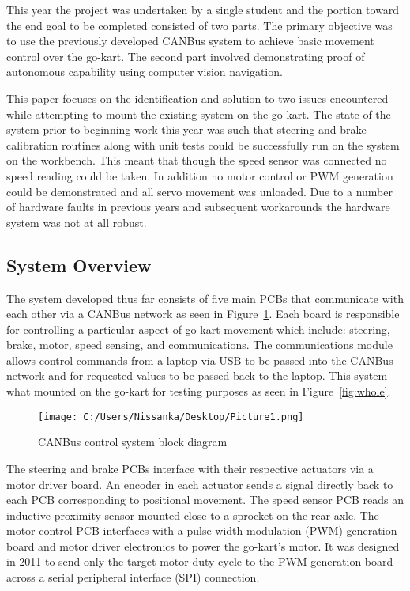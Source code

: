 \documentclass{ENZCon}
\begin{document}
This year the project was undertaken by a single student and the portion toward the end goal to be completed 
consisted of two parts. The primary objective was to use the previously developed CANBus system to achieve basic movement control over the go-kart. The second part involved demonstrating proof of autonomous capability using computer vision navigation.

This paper focuses on the identification and solution to two issues encountered while attempting to mount the existing system on the go-kart. The state of the system prior to beginning work this year was such that steering and brake calibration routines along with unit tests could be successfully run on the system on the workbench. This meant that though the speed sensor was connected no speed reading could be taken. In addition no motor control or PWM generation could be demonstrated and all servo movement was unloaded. Due to a number of hardware faults in previous years and subsequent workarounds the hardware system was not at all robust. 

\subsection{System Overview}

The system developed thus far consists of five main PCBs that communicate with each other via a CANBus network as seen in Figure~\ref{fig:block}. Each board is responsible for controlling a particular aspect of go-kart movement which include: steering, brake, motor, speed sensing, and communications. The communications module allows control commands from a laptop via USB to be passed into the CANBus network and for requested values to be passed back to the laptop. This system what mounted on the go-kart for testing purposes as seen in Figure~\ref{fig:whole}. 

\begin{figure}[htbp]
	\centering
		\texttt{[image: C:/Users/Nissanka/Desktop/Picture1.png]}
	\caption{CANBus control system block diagram}
	\label{fig:block}
\end{figure}

The steering and brake PCBs interface with their respective actuators via a motor driver board. An encoder in each actuator sends a signal directly back to each PCB corresponding to positional movement. The speed sensor PCB reads an inductive proximity sensor mounted close to a sprocket on the rear axle. The motor control PCB interfaces with a pulse width modulation (PWM) generation board and motor driver electronics to power the go-kart's motor. It was designed in 2011 to send only the target motor duty cycle to the PWM generation board across a serial peripheral interface (SPI) connection. 
\end{document}
